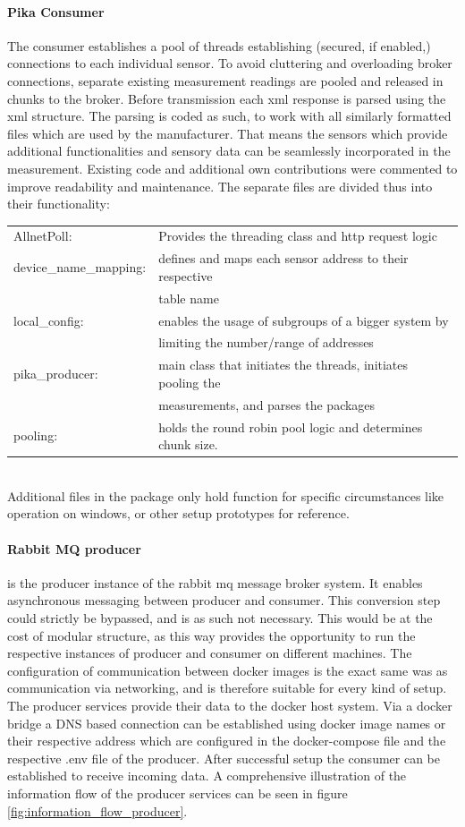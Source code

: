 \paragraph{Pika Consumer}  The consumer establishes a pool of threads establishing (secured, if enabled,) connections to each individual sensor. To avoid cluttering and overloading broker connections, separate existing measurement readings are pooled and released in chunks to the broker. Before transmission each xml response is parsed using the xml structure. The parsing is coded as such, to work with all similarly formatted files which are used by the manufacturer. That means the sensors which provide additional functionalities and sensory data can be seamlessly incorporated in the measurement.
Existing code and additional own contributions were commented to improve readability and maintenance.
The separate files are divided thus into their functionality:
\begin{tabular}{ll}
	AllnetPoll: & Provides the threading class and http request logic \\
	device\_name\_mapping: & defines and maps each sensor address to their respective\\ & table name \\
	local\_config: & enables the usage of subgroups of a bigger system by \\& limiting the number/range of addresses \\
	pika\_producer: & main class that initiates the threads, initiates pooling the\\ & measurements, and parses the packages \\
	pooling: & holds the round robin pool logic and determines chunk size.	\\
\end{tabular}\\

Additional files in the package only hold function for specific circumstances like operation on windows, or other setup prototypes for reference.

\paragraph{Rabbit MQ producer} is the producer instance of the rabbit mq message broker system. It enables asynchronous messaging between producer and consumer. This conversion step could strictly be bypassed, and is as such not necessary. This would be at the cost of modular structure, as this way provides the opportunity to run the respective instances of producer and consumer on different machines. The configuration of communication between docker images is the exact same was as communication via networking, and is therefore suitable for every kind of setup. The producer services provide their data to the docker host system. Via a docker bridge a DNS based connection can be established using docker image names or their respective address which are configured in the docker-compose file and the respective .env file of the producer. After successful setup the consumer can be established to receive incoming data. A comprehensive illustration of the information flow of the producer services can be seen in figure \ref{fig:information_flow_producer}.

